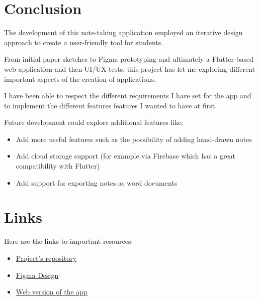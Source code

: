 \documentclass[]{article}
\begin{document}
	\pagebreak
	
	\section{Conclusion}
	
	The development of this note-taking application employed an iterative design approach to create a user-friendly tool for students.\linebreak
	
	From initial paper sketches to Figma prototyping and ultimately a Flutter-based web application and then UI/UX tests, this project has let me exploring different important aspects of the creation of applications.\linebreak
	
	I have been able to respect the different requirements I have set for the app and to implement the different features features I wanted to have at first.\linebreak
	
	Future development could explore additional features like:
	
	\begin{itemize}
		\item Add more useful features such as the possibility of adding hand-drawn notes
		\item Add cloud storage support (for example via Firebase which has a great compatibility with Flutter)
		\item Add support for exporting notes as word documents
	\end{itemize}
	
	\pagebreak
	
	\section{Links}
	
	Here are the links to important resources:
	
	\begin{itemize}
		\item \href{https://github.com/Logan-Developer/ui-lahumbert/tree/main/FinalProject}{Project's repository} 
		
		\item \href{https://www.figma.com/file/ZOlxVGHb9fLdk5uUODqMU9/CSCI-337---Notes-Taking-App?type=design&node-id=54810%3A34721&mode=design&t=fS6KJvRgsvtgz9cf-1}{Figma Design}
		
		\item
		\href{https://class-snap.tech/}{Web version of the app}
	\end{itemize}
	
	\label{LastPage}
\end{document}
